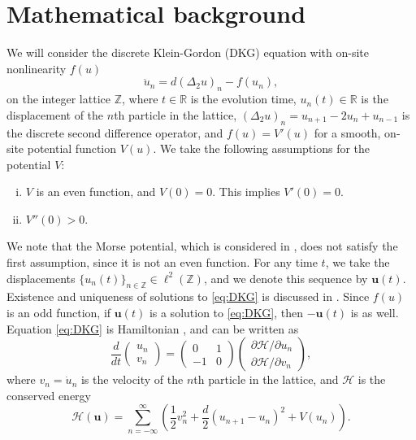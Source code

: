 \documentclass[12pt,reqno]{amsart}
\def\R{{\mathbb R}}
\def\Z{{\mathbb Z}}
\def\calH{\mathcal{H}}
\newcommand{\uvec}{\mathbf{u}}
\theoremstyle{definition}
\begin{document}
\section{Mathematical background}\label{sec:bg}

We will consider the discrete Klein-Gordon (DKG) equation with on-site nonlinearity $f(u)$
\begin{equation}\label{eq:DKG}
\ddot{u}_n = d (\Delta_2 u)_n - f(u_n),
\end{equation}
on the integer lattice $\Z$, where $t \in \R$ is the evolution time, $u_n(t) \in \R$ is the displacement of the $n$th particle in the lattice, $(\Delta_2 u)_n = u_{n+1} - 2 u_n + u_{n-1}$ is the discrete second difference operator, and $f(u) = V'(u)$ for a smooth, on-site potential function $V(u)$. We take the following assumptions for the potential $V$:
\begin{enumerate}[(i)\leftmargin=\parindent]
\item $V$ is an even function, and $V(0) = 0$. This implies $V'(0) = 0$.
\item $V''(0)>0$.
\end{enumerate}
We note that the Morse potential, which is considered in \cite{cuevas-maraver2016}, does not satisfy the first assumption, since it is not an even function. For any time $t$, we take the displacements $\{u_n(t)\}_{n \in \Z} \in \ell^2(\Z)$, and we denote this sequence by $\uvec(t)$. Existence and uniqueness of solutions to \cref{eq:DKG} is discussed in \cite{cuevas-maraver2016}. Since $f(u)$ is an odd function, if $\uvec(t)$ is a solution to \cref{eq:DKG}, then $-\uvec(t)$ is as well. Equation \cref{eq:DKG} is Hamiltonian \cites{KevrekidisWeinstein2000,cuevas-maraver2016}, and can be written as
\begin{equation}\label{eq:Hform}
\frac{d}{dt}\begin{pmatrix} u_n \\ v_n \end{pmatrix} = 
\begin{pmatrix} 0 & 1 \\ -1 & 0 \end{pmatrix}\begin{pmatrix} \partial \calH / \partial u_n \\ \partial \calH / \partial v_n \end{pmatrix},
\end{equation}
where $v_n = \dot{u}_n$ is the velocity of the $n$th particle in the lattice, and $\calH$ is the conserved energy
\begin{equation}\label{eq:H}
	\calH(\uvec) = \sum_{n=-\infty}^\infty 
	\left( \frac{1}{2} v_n^2 + \frac{d}{2} (u_{n+1} - u_n)^2 + V(u_n) \right).
\end{equation}
\end{document}
